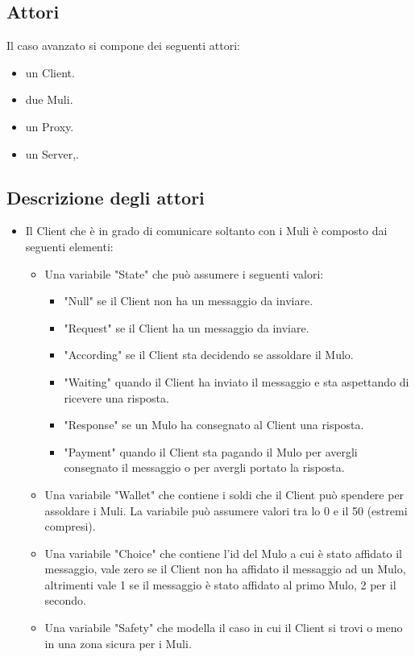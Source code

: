 \documentclass[13pt,a4paper]{article}
\begin{document}
\subsection{Attori}
Il caso avanzato si compone dei seguenti attori: 
\begin{itemize}
	\item un Client.
	\item due Muli.
	\item un Proxy.
	\item un Server,.
\end{itemize}

\subsection{Descrizione degli attori}
\begin{itemize}
	\item Il Client che è in grado di comunicare soltanto con i Muli è composto dai seguenti elementi:
	\begin{itemize}
		\item Una variabile "State" che può assumere i seguenti valori:
		\begin{itemize}
			\item "Null" se il Client non ha un messaggio da inviare.
			\item "Request" se il Client ha un messaggio da inviare.
			\item "According" se il Client sta decidendo se assoldare il Mulo.
			\item "Waiting"  quando il Client ha inviato il messaggio e sta aspettando di ricevere una risposta.
			\item "Response" se un Mulo ha consegnato al Client una risposta.
			\item "Payment" quando il Client sta pagando il Mulo per avergli consegnato il messaggio o  per avergli portato la risposta.
		\end{itemize}
		\item Una variabile "Wallet" che contiene i soldi che il Client può spendere per assoldare i Muli. La variabile può assumere valori tra lo 0 e il 50 (estremi compresi).
		\item Una variabile "Choice" che contiene l'id del Mulo a cui è stato affidato il messaggio, vale zero se il Client non ha  affidato il messaggio ad un Mulo, altrimenti vale 1 se il messaggio è stato affidato al primo Mulo, 2 per il secondo.
		\item Una variabile "Safety" che modella il caso in cui il Client si trovi o meno in una zona sicura per i Muli.

\end{itemize}
\end{itemize}
\end{document}
